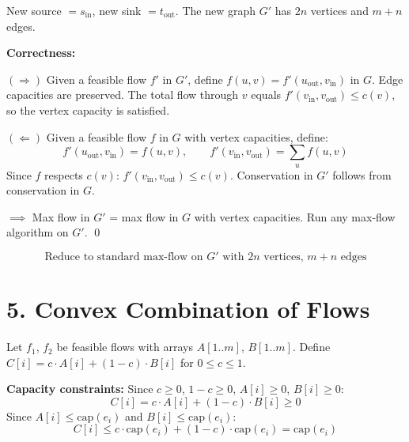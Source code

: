 \documentclass[11pt]{article}
\begin{document}
New source $= s_{\mathrm{in}}$, new sink $= t_{\mathrm{out}}$. The new graph $G'$ has $2n$ vertices and $m + n$ edges.

\textbf{Correctness:}

$(\Rightarrow)$ Given a feasible flow $f'$ in $G'$, define $f(u,v) = f'(u_{\mathrm{out}}, v_{\mathrm{in}})$ in $G$. Edge capacities are preserved. The total flow through $v$ equals $f'(v_{\mathrm{in}}, v_{\mathrm{out}}) \le c(v)$, so the vertex capacity is satisfied.

$(\Leftarrow)$ Given a feasible flow $f$ in $G$ with vertex capacities, define:
\[
f'(u_{\mathrm{out}}, v_{\mathrm{in}}) = f(u,v), \qquad f'(v_{\mathrm{in}}, v_{\mathrm{out}}) = \textstyle\sum_{u} f(u,v)
\]
Since $f$ respects $c(v)$: $f'(v_{\mathrm{in}}, v_{\mathrm{out}}) \le c(v)$. Conservation in $G'$ follows from conservation in $G$.

$\implies$ Max flow in $G'$ = max flow in $G$ with vertex capacities. Run any max-flow algorithm on $G'$. \qed

\[\boxed{\text{Reduce to standard max-flow on } G' \text{ with } 2n \text{ vertices, } m + n \text{ edges}}\]


\section*{5. Convex Combination of Flows}

\begin{center}
\end{center}

Let $f_1$, $f_2$ be feasible flows with arrays $A[1..m]$, $B[1..m]$. Define $C[i] = c \cdot A[i] + (1 - c) \cdot B[i]$ for $0 \le c \le 1$.

\textbf{Capacity constraints:} Since $c \ge 0$, $1 - c \ge 0$, $A[i] \ge 0$, $B[i] \ge 0$:
\[
C[i] = c \cdot A[i] + (1-c) \cdot B[i] \ge 0
\]
Since $A[i] \le \mathrm{cap}(e_i)$ and $B[i] \le \mathrm{cap}(e_i)$:
\[
C[i] \le c \cdot \mathrm{cap}(e_i) + (1-c) \cdot \mathrm{cap}(e_i) = \mathrm{cap}(e_i)
\]
\end{document}
